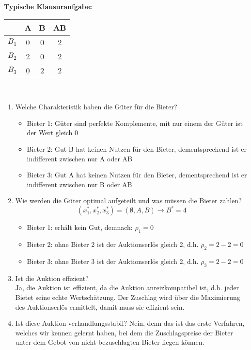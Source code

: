 \documentclass[12pt]{extreport} %
\theoremstyle{named}
\theoremstyle{nnamed}
\theoremstyle{itshape}
\theoremstyle{normal}
\begin{document}
\textbf{Typische Klausuraufgabe:} ~\\

\begin{figure*}[h!] \centering
	\begin{tabular}{l|ccc}
		& A & B & AB \\
  			\hline
  		$B_1$ & 0 & 0 & 2  \\
  		$B_2$ & 2 & 0 & 2  \\
  		$B_3$ & 0 & 2 & 2  
	\end{tabular}
\end{figure*}	~\\

\begin{enumerate}
	\item  Welche Charakteristik haben die Güter für die Bieter?
		\begin{itemize}
			\item Bieter 1: Güter sind perfekte Komplemente, mit nur einem der Güter ist der Wert gleich 0
			\item Bieter 2: Gut B hat keinen Nutzen für den Bieter, dementsprechend ist er indifferent zwischen nur A oder AB
			\item Bieter 3: Gut A hat keinen Nutzen für den Bieter, dementsprechend ist er indifferent zwischen nur B oder AB
		\end{itemize}
	\item Wie werden die Güter optimal aufgeteilt und was müssen die Bieter zahlen?
		$$ \left( x_1^*, x_2^*, x_3^* \right) = \left( \emptyset, A, B \right) \rightarrow B^* = 4 $$
		\begin{itemize}
			\item Bieter 1: erhält kein Gut, demnach: $\rho_1 = 0$
			\item Bieter 2: ohne Bieter 2 ist der Auktionserlös gleich 2, d.h. $\rho_2 = 2 - 2 = 0$
			\item Bieter 3: ohne Bieter 3 ist der Auktionserlös gleich 2, d.h. $\rho_3 = 2 - 2 = 0$
		\end{itemize}
	\item Ist die Auktion effizient? ~\\
		Ja, die Auktion ist effizient, da die Auktion anreizkompatibel ist, d.h. jeder Bietet seine echte Wertschätzung. Der Zuschlag wird über die Maximierung des Auktionserlös ermittelt, damit muss sie effizient sein.	
	\item Ist diese Auktion verhandlungsstabil?
		Nein, denn das ist das erste Verfahren, welches wir kennen gelernt haben, bei dem die Zuschlagspreise der Bieter unter dem Gebot von nicht-bezuschlagten Bieter liegen können.
\end{enumerate} ~\newpage
\end{document}
